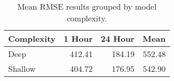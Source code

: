 \begin{table}[H]
\centering
\begin{tabular}{lrrr}
\toprule
Complexity & 1 Hour & 24 Hour & Mean \\
\midrule
Deep & 412.41 & 184.19 & 552.48 \\
Shallow & 404.72 & 176.95 & 542.90 \\
\bottomrule
\end{tabular}
\caption{Mean RMSE results grouped by model complexity.}
\label{complexity-RMSE}
\end{table}
